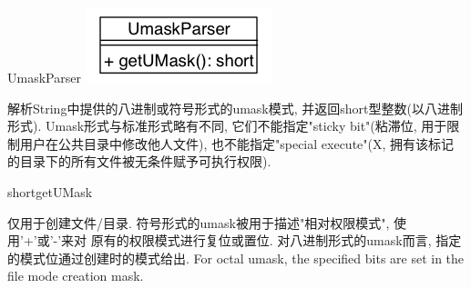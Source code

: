 \begin{XeClass}{UmaskParser}
\includegraphics[width=\textwidth]{cdig/UmaskParser.png}
     
 解析String中提供的八进制或符号形式的umask模式, 并返回short型整数(以八进制形式).
 Umask形式与标准形式略有不同, 它们不能指定"sticky bit"(粘滞位, 用于限制用户在公共目录中修改他人文件),
 也不能指定"special execute"(X, 拥有该标记的目录下的所有文件被无条件赋予可执行权限).

    \begin{XeMethod}{\XePublic}{short}{getUMask}
         
 仅用于创建文件/目录. 符号形式的umask被用于描述"相对权限模式", 使用'+'或'-'来对
 原有的权限模式进行复位或置位.
 对八进制形式的umask而言, 指定的模式位通过创建时的模式给出.
 For octal umask, the specified bits are set in the file mode creation mask.

    \end{XeMethod}

\end{XeClass}
